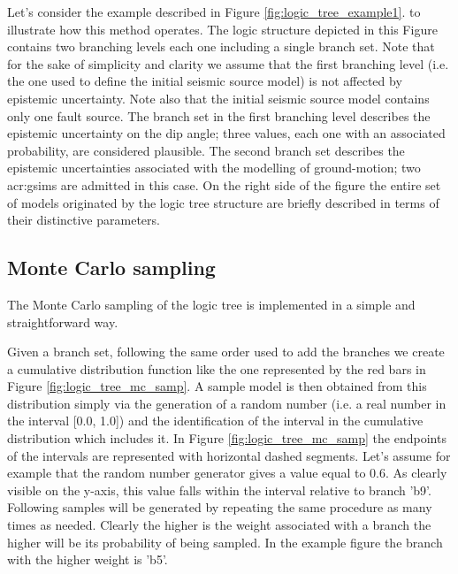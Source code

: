 Let's consider the example described in Figure \ref{fig:logic_tree_example1}.
to illustrate how this method operates.
%
The logic structure depicted in this Figure contains two branching 
levels each one including a single branch set. 
%
Note that for the sake of simplicity and clarity we assume that the first 
branching level (i.e. the one used to define the initial seismic source 
model) is not affected by epistemic uncertainty. 
%
Note also that the initial seismic source model contains only one fault 
source.
%
The branch set in the first branching level describes the epistemic 
uncertainty on the dip angle; three values, each one with an associated 
probability, are considered plausible. 
%
The second branch set describes the epistemic uncertainties associated with 
the modelling of ground-motion; two \glspl{acr:gsim} are admitted in this
case. 
%
On the right side of the figure the entire set of models originated by the 
logic tree structure are briefly described in terms of their 
distinctive parameters.
\subsection{Monte Carlo sampling}
The Monte Carlo sampling of the logic tree is implemented in a simple and 
straightforward way. 

Given a branch set, following the same order used to add the branches 
we create a cumulative distribution function like the one represented 
by the red bars in Figure \ref{fig:logic_tree_mc_samp}. 
%
A sample model is then obtained from this distribution simply via the 
generation of a random number (i.e. a real number in the interval 
[0.0, 1.0]) and the identification of the interval in the cumulative 
distribution which includes it. In Figure \ref{fig:logic_tree_mc_samp}
the endpoints of the intervals are represented with horizontal dashed
segments. Let's assume for example that the random number generator
gives a value equal to 0.6. As clearly visible on the y-axis,
this value falls within the interval relative to branch 'b9'. 
%
Following samples will be generated by repeating the same procedure as
many times as needed. Clearly the higher is the weight associated with 
a branch the higher will be its probability of being sampled. In the 
example figure the branch with the higher weight is 'b5'.

